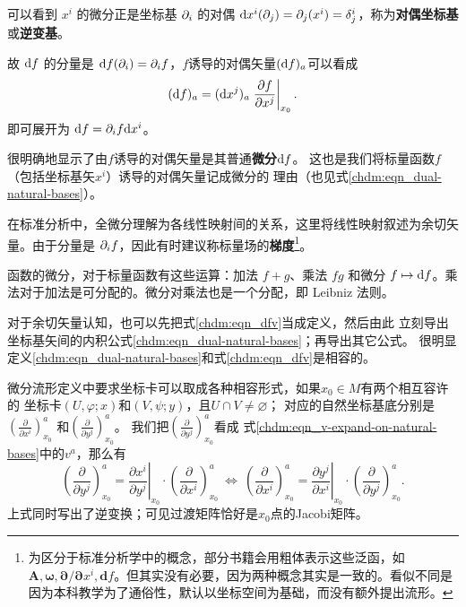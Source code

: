 可以看到 $x^i$ 的微分正是坐标基 $\partial_i$ 的对偶 $\dd x^i(\partial_j)=\partial_j(x^i)=\delta^i_j$，称为\textbf{对偶坐标基}或\textbf{逆变基}。

故 $\dd f$ 的分量是 $\dd f(\partial_i)=\partial_i f$，$f$诱导的对偶矢量$({\rm d}f)_a$可以看成
\begin{equation}\label{chdm:eqn_df}
    ({\rm d}f)_a = ({\rm d}x^j)_a \left.\frac{\partial f}{\partial x^j}\right|_{x_0} .
\end{equation}
即可展开为 $\dd f=\partial_i f \dd x^i$。

很明确地显示了由$f$诱导的对偶矢量是其普通\textbf{微分}${\rm d}f$。
这也是我们将标量函数$f$（包括坐标基矢$x^i$）诱导的对偶矢量记成微分的
理由（也见式\eqref{chdm:eqn_dual-natural-bases}）。

在标准分析中，全微分理解为各线性映射间的关系，这里将线性映射叙述为余切矢量。由于分量是 $\partial_i f$，因此有时建议称标量场的\textbf{梯度}\footnote{为区分于标准分析学中的概念，部分书籍会用粗体表示这些泛函，如 $\bm A,\bm\omega,\bm{\partial}/{\bm{\partial}x^i},\mathbf{d}f$。但其实没有必要，因为两种概念其实是一致的。看似不同是因为本科教学为了通俗性，默认以坐标空间为基础，而没有额外提出流形。}。

函数的微分，对于标量函数有这些运算：加法 $f+g$、乘法 $fg$ 和微分 $f\mapsto\text df$。乘法对于加法是可分配的。微分对乘法也是一个分配，即 Leibniz 法则。

对于余切矢量认知，也可以先把式\eqref{chdm:eqn_dfv}当成定义，然后由此
立刻导出坐标基矢间的内积公式\eqref{chdm:eqn_dual-natural-bases}；再导出其它公式。
很明显定义\eqref{chdm:eqn_dual-natural-bases}和式\eqref{chdm:eqn_dfv}是相容的。


微分流形定义中要求坐标卡可以取成各种相容形式，如果$x_0\in M$有两个相互容许的
坐标卡$(U,\varphi;x)$和$(V,\psi;y)$，且$U\cap V \neq \varnothing$；
对应的自然坐标基底分别是$(\frac{\partial }{\partial x^i})^a_{x_0} $
和$(\frac{\partial }{\partial y^j})^a_{x_0} $。
我们把$(\frac{\partial }{\partial y^j})^a_{x_0} $看成
式\eqref{chdm:eqn_v-expand-on-natural-bases}中的$v^a$，那么有
\begin{equation}\label{chdm:eqn_xy-transform}
    \left(\frac{\partial }{\partial y^j}\right)^a_{x_0} = \left. \frac{\partial x^i}{\partial y^j}\right|_{x_0} \cdot
    \left(\frac{\partial }{\partial x^i}\right)^a_{x_0}     {\ \Leftrightarrow \ }
    \left(\frac{\partial }{\partial x^i}\right)^a_{x_0} = \left. \frac{\partial y^j}{\partial x^i}\right|_{x_0} \cdot
    \left(\frac{\partial }{\partial y^j}\right)^a_{x_0} .
\end{equation}
上式同时写出了逆变换；可见过渡矩阵恰好是$x_0$点的Jacobi矩阵。


